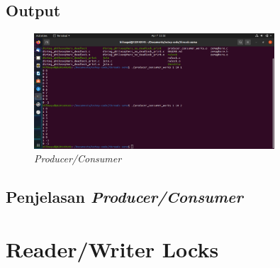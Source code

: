 \documentclass[11pt,a4paper]{article}
\begin{document}
\subsection{Output}
\begin{figure}[h]
	\centering
	\includegraphics[width=0.8\textwidth]{Figure1/produce.png}
	\caption{\textit{Producer/Consumer}}
\end{figure}

\subsection{Penjelasan \textit{Producer/Consumer}}

\section{Reader/Writer Locks}
\end{document}
